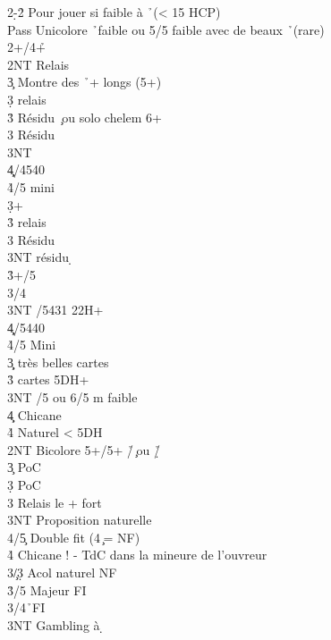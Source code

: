 \documentclass[a4paper]{article}
\begin{document}
\begin{bidtable}
2\d-2\h \> Pour jouer si faible à \h\ (< 15 HCP)\+\\
Pass \> Unicolore \h\ faible ou 5/5 faible avec de beaux \h\ (rare)\\
2\s {}+\s /4+\h \+\\
2NT \> Relais\+\\
3\c \> Montre des \h\ + longs (5+)\+\\
3\d \> relais\+\\
3\h \> Résidu \c\ ou solo chelem 6+\\
3\s \> Résidu \d \\
3NT \\
4\c\d {}/4540\\
4\h {}/5 mini\-\-\\
3\d {}+ \s \+\\
3\h \> relais\+\\
3\s \> Résidu \c \\
3NT \> résidu \d \-\-\\
3\h {}+/5\\
3\s {}/4\\
3NT /5431 22H+\\
4\c\d {}/5440\\
4\h {}/5 Mini\-\\
3\c\d {} très belles cartes\\
3\h\s {} cartes 5DH+\\
3NT /5 ou 6/5 m faible\\
4\c\d \> Chicane\\
4\h\s \> Naturel < 5DH\-\\
2NT \> Bicolore 5+/5+ \h /\c\ ou \h /\d \+\\
3\c \> PoC\\
3\d \> PoC\\
3\s \> Relais le + fort\\
3NT \> Proposition naturelle\\
4/5\c \> Double fit (4\c\ = NF)\\
4\h \> Chicane ! - TdC dans la mineure de l'ouvreur\-\\
3\c/3\d \> Acol naturel NF\\
3\h {}/5 Majeur FI\\
3\s {}\s /4\h\ FI\\
3NT \> Gambling à \d \-
\end{bidtable}
\end{document}
